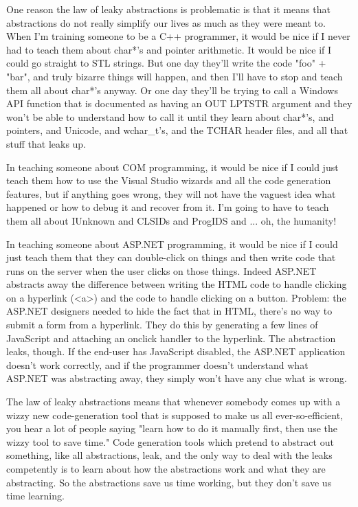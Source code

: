 \documentclass{article}
\begin{document}
One reason the law of leaky abstractions is problematic is that it means that abstractions do not really simplify our lives as much as they were meant to. When I'm training someone to be a C++ programmer, it would be nice if I never had to teach them about char*'s and pointer arithmetic. It would be nice if I could go straight to STL strings. But one day they'll write the code "foo" + "bar", and truly bizarre things will happen, and then I'll have to stop and teach them all about char*'s anyway. Or one day they'll be trying to call a Windows API function that is documented as having an OUT LPTSTR argument and they won't be able to understand how to call it until they learn about char*'s, and pointers, and Unicode, and wchar\_t's, and the TCHAR header files, and all that stuff that leaks up.

In teaching someone about COM programming, it would be nice if I could just teach them how to use the Visual Studio wizards and all the code generation features, but if anything goes wrong, they will not have the vaguest idea what happened or how to debug it and recover from it. I'm going to have to teach them all about IUnknown and CLSIDs and ProgIDS and ... oh, the humanity!

In teaching someone about ASP.NET programming, it would be nice if I could just teach them that they can double-click on things and then write code that runs on the server when the user clicks on those things. Indeed ASP.NET abstracts away the difference between writing the HTML code to handle clicking on a hyperlink (<a>) and the code to handle clicking on a button. Problem: the ASP.NET designers needed to hide the fact that in HTML, there's no way to submit a form from a hyperlink. They do this by generating a few lines of JavaScript and attaching an onclick handler to the hyperlink. The abstraction leaks, though. If the end-user has JavaScript disabled, the ASP.NET application doesn't work correctly, and if the programmer doesn't understand what ASP.NET was abstracting away, they simply won't have any clue what is wrong.

The law of leaky abstractions means that whenever somebody comes up with a wizzy new code-generation tool that is supposed to make us all ever-so-efficient, you hear a lot of people saying "learn how to do it manually first, then use the wizzy tool to save time." Code generation tools which pretend to abstract out something, like all abstractions, leak, and the only way to deal with the leaks competently is to learn about how the abstractions work and what they are abstracting. So the abstractions save us time working, but they don't save us time learning.
\end{document}
